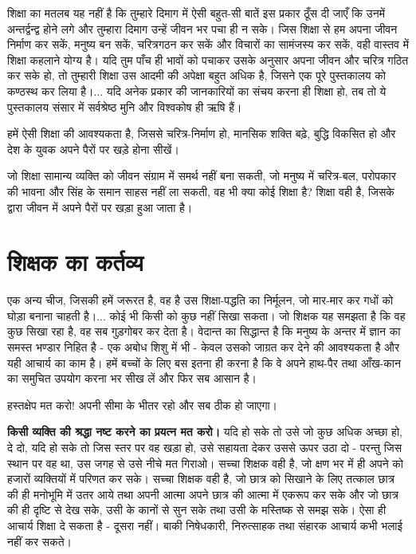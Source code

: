 शिक्षा का मतलब यह नहीं है कि तुम्हारे दिमाग में ऐसी बहुत-सी बातें इस प्रकार ठूँस दी जाएँ कि उनमें अन्तर्द्वन्द्व होने लगे और तुम्हारा दिमाग उन्हें जीवन भर पचा ही न सके। जिस शिक्षा से हम अपना जीवन निर्माण कर सकें, मनुष्य बन सकें, चरित्रगठन कर सकें और विचारों का सामंजस्य कर सकें, वही वास्तव में शिक्षा कहलाने योग्य है। यदि तुम पाँच ही भावों को पचाकर उसके अनुसार अपना जीवन और चरित्र गठित कर सके हो, तो तुम्हारी शिक्षा उस आदमी की अपेक्षा बहुत अधिक है, जिसने एक पूरे पुस्तकालय को कण्ठस्थ कर लिया है।... यदि अनेक प्रकार की जानकारियों का संचय करना ही शिक्षा हो, तब तो ये पुस्तकालय संसार में सर्वश्रेष्ठ मुनि और विश्वकोष ही ऋषि हैं। 

हमें ऐसी शिक्षा की आवश्यकता है, जिससे चरित्र-निर्माण हो, मानसिक शक्ति बढ़े, बुद्धि विकसित हो और देश के युवक अपने पैरों पर खड़े होना सीखें। 

जो शिक्षा सामान्य व्यक्ति को जीवन संग्राम में समर्थ नहीं बना सकती, जो मनुष्य में चरित्र-बल, परोपकार की भावना और सिंह के समान साहस नहीं ला सकती, वह भी क्या कोई शिक्षा है? शिक्षा वही है, जिसके द्वारा जीवन में अपने पैरों पर खड़ा हुआ जाता है।


\section*{शिक्षक का कर्तव्य}


एक अन्य चीज, जिसकी हमें जरूरत है, वह है उस शिक्षा-पद्धति का निर्मूलन, जो मार-मार कर गधों को घोड़ा बनाना चाहती है।... कोई भी किसी को कुछ नहीं सिखा सकता। जो शिक्षक यह समझता है कि वह कुछ सिखा रहा है, वह सब गुड़गोबर कर देता है। वेदान्त का सिद्धान्त है कि मनुष्य के अन्तर में ज्ञान का समस्त भण्डार निहित है - एक अबोध शिशु में भी - केवल उसको जाग्रत कर देने की आवश्यकता है और यही आचार्य का काम है। हमें बच्चों के लिए बस इतना ही करना है कि वे अपने हाथ-पैर तथा आँख-कान का समुचित उपयोग करना भर सीख लें और फिर सब आसान है। 

हस्तक्षेप मत करो! अपनी सीमा के भीतर रहो और सब ठीक हो जाएगा। 

\textbf{किसी व्यक्ति की श्रद्धा नष्ट करने का प्रयत्न मत करो। } यदि हो सके तो उसे जो कुछ अधिक अच्छा हो, दे दो, यदि हो सके तो जिस स्तर पर वह खड़ा हो, उसे सहायता देकर उससे ऊपर उठा दो - परन्तु जिस स्थान पर वह था, उस जगह से उसे नीचे मत गिराओ। सच्चा शिक्षक वही है, जो क्षण भर में ही अपने को हजारों व्यक्तियों में परिणत कर सके। सच्चा शिक्षक वही है, जो छात्र को सिखाने के लिए तत्काल छात्र की ही मनोभूमि में उतर आये तथा अपनी आत्मा अपने छात्र की आत्मा में एकरूप कर सके और जो छात्र की ही दृष्टि से देख सके, उसी के कानों से सुन सके तथा उसी के मस्तिष्क से समझ सके। ऐसा ही आचार्य शिक्षा दे सकता है - दूसरा नहीं। बाकी निषेधकारी, निरुत्साहक तथा संहारक आचार्य कभी भलाई नहीं कर सकते।


